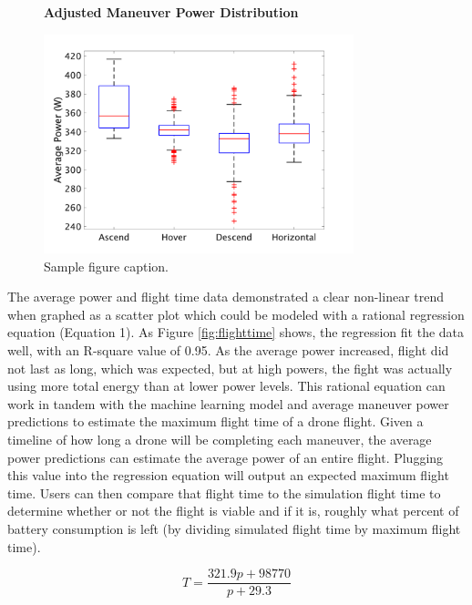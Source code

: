 \documentclass{article}
\begin{document}
\begin{figure}[!h]
  \centering
  \large{\textbf{Adjusted Maneuver Power Distribution}}\par
  \includegraphics[width = 90mm]{images/powerfinal.png}
  \caption{Sample figure caption.}
  \label{fig:powerfinal}
\end{figure}

The average power and flight time data demonstrated a clear non-linear trend when graphed as a scatter plot which could be modeled with a rational regression equation (Equation 1). As Figure \ref{fig:flighttime} shows, the regression fit the data well, with an R-square value of 0.95. As the average power increased, flight did not last as long, which was expected, but at high powers, the fight was actually using more total energy than at lower power levels. This rational equation can work in tandem with the machine learning model and average maneuver power predictions to estimate the maximum flight time of a drone flight. Given a timeline of how long a drone will be completing each maneuver, the average power predictions can estimate the average power of an entire flight. Plugging this value into the regression equation will output an expected maximum flight time. Users can then compare that flight time to the simulation flight time to determine whether or not the flight is viable and if it is, roughly what percent of battery consumption is left (by dividing simulated flight time by maximum flight time).

\begin{equation}
T={\frac {321.9p + 98770}{p + 29.3}}
\end{equation}
\end{document}
